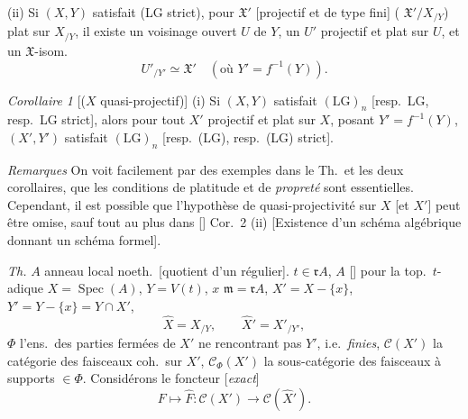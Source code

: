 \documentclass[11pt,a4paper]{article}
\begin{document}
(ii) Si $(X, Y)$ satisfait (LG strict), pour  $\mathfrak{X}'$ [projectif et de type fini] (\struck{\ill{}} $\mathfrak{X}'/X_{/Y}$) plat sur $X_{/Y}$, il existe un voisinage ouvert $U$ de $Y$, \struck{\ill{}} un $U'$ projectif  et plat sur $U$, et un $\mathfrak{X}$-isom.
\[
  U'_{/Y'} \simeq \mathfrak{X}' \quad (\text{où } Y' = f^{-1}(Y)).
\]

\emph{Corollaire 1} [($X$ quasi-projectif)] (i) Si $(X, Y)$ satisfait $(\mathrm{LG})_n$  [resp.\ LG, resp.\ LG strict], alors pour tout $X'$ projectif et plat sur $X$, posant  $Y' = f^{-1}(Y)$, $(X', Y')$ satisfait $(\mathrm{LG})_n$ [resp.\ (LG), resp.\ (LG) strict].


\emph{Remarques} On voit facilement par des exemples dans le Th.\ et les deux corollaires, que les conditions de platitude et de \emph{propreté} sont essentielles. Cependant, il  est possible que l'hypothèse de quasi-projectivité sur $X$ [et $X'$]  peut être omise,  sauf tout au plus dans [] Cor.~2 (ii) [Existence d'un schéma algébrique donnant un schéma formel].

\emph{Th.} $A$ anneau local noeth.\ [quotient d'un régulier]. $t \in \mathfrak{r}A$, $A$  [\ill{}] pour la top.\ $t$-adique
$X = \operatorname{Spec}(A)$, $Y = V(t)$, $x$ \ill{} $\mathfrak{m} = \mathfrak{r}A$, $X' = X - \lbrace x \rbrace$, $Y' = Y - \lbrace x \rbrace = Y \cap X'$,
\[
  \hat{X} = X_{/Y}, \qquad \hat{X}' = X'_{/Y'},
\]
$\Phi$ l'ens.\ des parties fermées de $X'$ ne rencontrant pas $Y'$, i.e.\ \emph{finies}, $\mathcal{C}(X')$ la catégorie des faisceaux coh.\ sur $X'$, $\mathcal{C}_\Phi(X')$ la sous-catégorie des faisceaux \struck{\ill{}} à supports $\in \Phi$. Considérons le foncteur [\emph{exact}]
\[
  F \mapsto \hat{F} : \mathcal{C}(X') \longrightarrow \mathcal{C}(\hat{X}') .
\]
\end{document}
